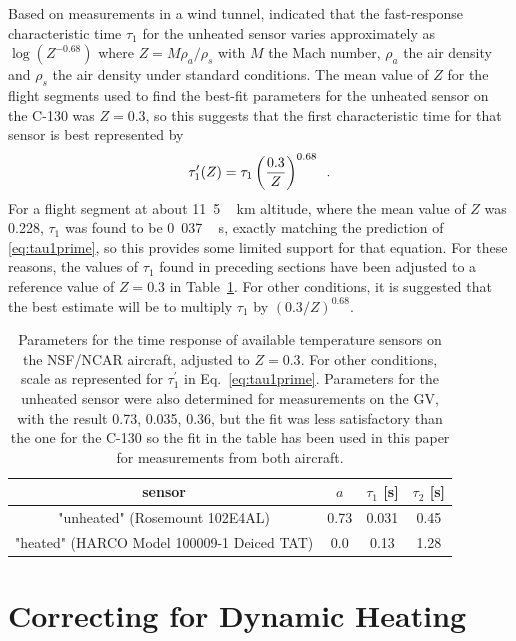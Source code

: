 \documentclass[amt, manuscript]{copernicus}
\begin{document}
Based on measurements in a wind tunnel, \citet{GoodrichTR5755} indicated
that the fast-response characteristic time \(\tau_{1}\) for the unheated
sensor varies approximately as \(\log(Z^{-0.68})\) where
\(Z=M\rho_{a}/\rho_{s}\) with \(M\) the Mach number, \(\rho_{a}\) the
air density and \(\rho_{s}\) the air density under standard conditions.
The mean value of \(Z\) for the flight segments used to find the
best-fit parameters for the unheated sensor on the C-130 was \(Z=0.3\),
so this suggests that the first characteristic time for that sensor is
best represented by \begin{equation}
\tau_{1}^{\prime}(Z)=\tau_{1}\left(\frac{0.3}{Z}\right)^{0.68}\,\,\,.{\label{eq:tau1prime}}
\end{equation} For a flight segment at about \unit{11.5\,km} altitude,
where the mean value of \(Z\) was 0.228, \(\tau_1\) was found to be
\unit{0.037\,s}, exactly matching the prediction of
\eqref{eq:tau1prime}, so this provides some limited support for that
equation. For these reasons, the values of \(\tau_1\) found in preceding
sections have been adjusted to a reference value of \(Z=0.3\) in
Table~\ref{tab:Parameters}. For other conditions, it is suggested that
the best estimate will be to multiply \(\tau_{1}\) by
\((0.3/Z)^{0.68}\).

\begin{table}[t]
\caption{Parameters for the time response of available temperature sensors
on the NSF/NCAR aircraft, adjusted to $Z=0.3$. For other conditions,
scale as represented for $\tau_{1}^{\prime}$ in 
Eq.\ \eqref{eq:tau1prime}. Parameters for the unheated sensor were also determined for measurements on the GV, with the result {0.73, 0.035, 0.36},
but the fit was less satisfactory than the one for the C-130 
so the fit in the table has been used in this paper for measurements from both aircraft.{\label{tab:Parameters}}}
\begin{tabular}{|c|c|c|c|}
\hline 
\bf{sensor} & $a$ & $\tau_{1}$ [s] & $\tau_{2}$ [s]\tabularnewline
\hline 
\hline 
"unheated" (Rosemount 102E4AL) & 0.73 & 0.031 & 0.45\tabularnewline
\hline 
"heated" (HARCO Model 100009-1 Deiced TAT)& 0.0 & 0.13 & 1.28\tabularnewline
\hline 
\end{tabular}
\end{table}

\section{\texorpdfstring{Correcting for Dynamic
Heating\label{sec:Correcting-for-Dynamic}}{Correcting for Dynamic Heating}}
\end{document}
